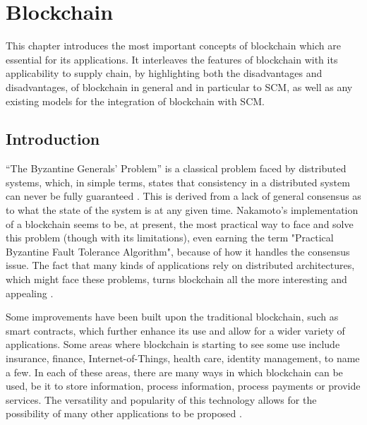 \chapter{Blockchain}
\label{chap:blockchain}


This chapter introduces the most important concepts of blockchain which are essential for its applications. It interleaves the features of blockchain with its applicability to supply chain, by highlighting both the disadvantages and disadvantages, of blockchain in general and in particular to SCM, as well as any existing models for the integration of blockchain with SCM.

    \section{Introduction}
   “The Byzantine Generals' Problem” is a classical problem faced by distributed systems, which, in simple terms, states that consistency in a distributed system can never be fully guaranteed \cite{byzantine-generals-problem}. This is derived from a lack of general consensus as to what the state of the system is at any given time.
   Nakamoto's implementation of a blockchain seems to be, at present, the most practical way to face and solve  this problem (though with its limitations), even earning the term "Practical Byzantine Fault Tolerance Algorithm", because of how it handles the consensus issue. The fact that many kinds of applications rely on distributed architectures, which might face these problems, turns blockchain all the more interesting and appealing . 
   
   Some improvements have been built upon the traditional blockchain, such as smart contracts, which further enhance its use and allow for a wider variety of applications. Some areas where blockchain is starting to see some use include insurance, finance, Internet-of-Things, health care, identity management, to name a few. 
   In each of these areas, there are many ways in which blockchain can be used, be it to store information, process information, process payments or provide services. The versatility and popularity of this technology allows for the possibility of many other applications to be proposed .

